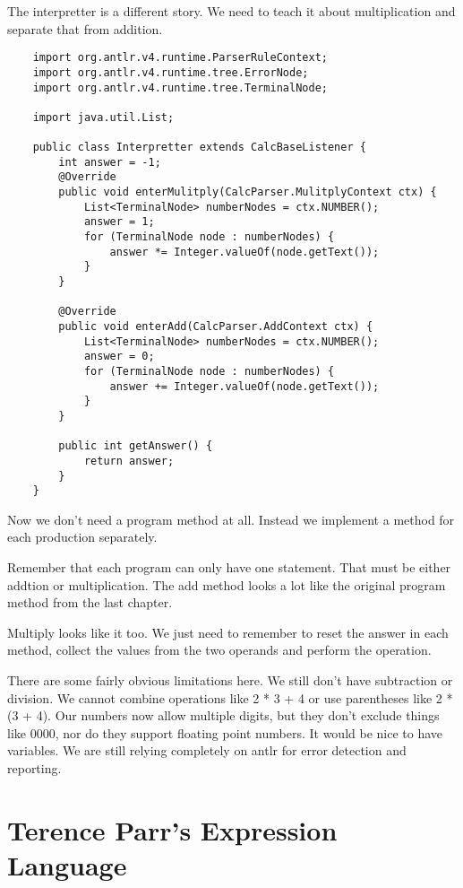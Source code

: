 The interpretter is a different story. We need to teach it about
multiplication and separate that from addition.

{\footnotesize
\begin{verbatim}
    import org.antlr.v4.runtime.ParserRuleContext;
    import org.antlr.v4.runtime.tree.ErrorNode;
    import org.antlr.v4.runtime.tree.TerminalNode;
    
    import java.util.List;
    
    public class Interpretter extends CalcBaseListener {
        int answer = -1;
    	@Override
        public void enterMulitply(CalcParser.MulitplyContext ctx) {
            List<TerminalNode> numberNodes = ctx.NUMBER();
            answer = 1;
            for (TerminalNode node : numberNodes) {
                answer *= Integer.valueOf(node.getText());
            }
        }
    
    	@Override
        public void enterAdd(CalcParser.AddContext ctx) {
            List<TerminalNode> numberNodes = ctx.NUMBER();
            answer = 0;
            for (TerminalNode node : numberNodes) {
                answer += Integer.valueOf(node.getText());
            }
        }
    
        public int getAnswer() {
            return answer;
        }
    }
\end{verbatim}
}

Now we don't need a program method at all. Instead we implement a method for
each production separately.

Remember that each program can only have one statement. That must be
either addtion or multiplication. The add method looks a lot like the
original program method from the last chapter.

Multiply looks like it too. We just need to remember to reset the
answer in each method, collect the values from the two operands
and perform the operation.

There are some fairly obvious limitations here. We still don't have
subtraction or division. We cannot combine operations like 2 * 3 + 4
or use parentheses like 2 * (3 + 4). Our numbers now allow multiple
digits, but they don't exclude things like 0000, nor do they support
floating point numbers. It would be nice to have variables.
We are still relying completely on antlr for error detection and reporting.

\section{Terence Parr's Expression Language}

